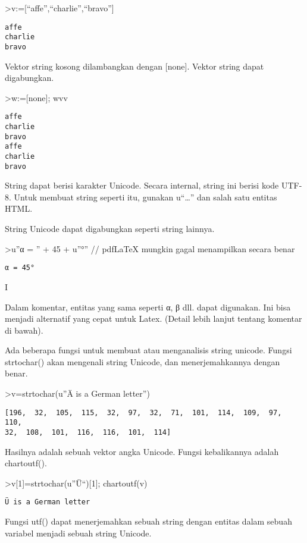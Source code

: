 \documentclass[
]{book}
\begin{document}
\textgreater v:={[}``affe'',``charlie'',``bravo''{]}

\begin{verbatim}
affe
charlie
bravo
\end{verbatim}

Vektor string kosong dilambangkan dengan {[}none{]}. Vektor string dapat digabungkan.

\textgreater w:={[}none{]}; w\textbar v\textbar v

\begin{verbatim}
affe
charlie
bravo
affe
charlie
bravo
\end{verbatim}

String dapat berisi karakter Unicode. Secara internal, string ini berisi kode UTF-8. Untuk membuat string seperti itu, gunakan u``\ldots'' dan salah satu entitas HTML.

String Unicode dapat digabungkan seperti string lainnya.

\textgreater u''α = '' + 45 + u''°'' // pdfLaTeX mungkin gagal menampilkan secara benar

\begin{verbatim}
α = 45°
\end{verbatim}

I

Dalam komentar, entitas yang sama seperti α, β dll. dapat digunakan. Ini bisa menjadi alternatif yang cepat untuk Latex. (Detail lebih lanjut tentang komentar di bawah).

Ada beberapa fungsi untuk membuat atau menganalisis string unicode. Fungsi strtochar() akan mengenali string Unicode, dan menerjemahkannya dengan benar.

\textgreater v=strtochar(u''Ä is a German letter'')

\begin{verbatim}
[196,  32,  105,  115,  32,  97,  32,  71,  101,  114,  109,  97,  110,
32,  108,  101,  116,  116,  101,  114]
\end{verbatim}

Hasilnya adalah sebuah vektor angka Unicode. Fungsi kebalikannya adalah chartoutf().

\textgreater v{[}1{]}=strtochar(u''Ü``){[}1{]}; chartoutf(v)

\begin{verbatim}
Ü is a German letter
\end{verbatim}

Fungsi utf() dapat menerjemahkan sebuah string dengan entitas dalam sebuah variabel menjadi sebuah string Unicode.
\end{document}

